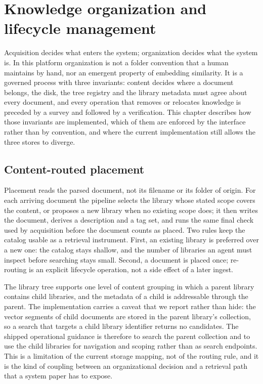 \section{Knowledge organization and lifecycle management}
\label{sec:organization}

Acquisition decides what enters the system; organization decides what the
system is. In this platform organization is not a folder convention that a
human maintains by hand, nor an emergent property of embedding similarity.
It is a governed process with three invariants: content decides where a
document belongs, the disk, the tree registry and the library metadata must
agree about every document, and every operation that removes or relocates
knowledge is preceded by a survey and followed by a verification. This
chapter describes how those invariants are implemented, which of them are
enforced by the interface rather than by convention, and where the current
implementation still allows the three stores to diverge.

\subsection{Content-routed placement}
\label{sec:org-placement}

Placement reads the parsed document, not its filename or its folder of
origin. For each arriving document the pipeline selects the library whose
stated scope covers the content, or proposes a new library when no existing
scope does; it then writes the document, derives a description and a tag
set, and runs the same final check used by acquisition before the document
counts as placed. Two rules keep the catalog usable as a retrieval
instrument. First, an existing library is preferred over a new one: the
catalog stays shallow, and the number of libraries an agent must inspect
before searching stays small. Second, a document is placed once; re-routing
is an explicit lifecycle operation, not a side effect of a later ingest.

The library tree supports one level of content grouping in which a parent
library contains child libraries, and the metadata of a child is addressable
through the parent. The implementation carries a caveat that we report
rather than hide: the vector segments of child documents are stored in the
parent library's collection, so a search that targets a child library
identifier returns no candidates. The shipped operational guidance is
therefore to search the parent collection and to use the child libraries for
navigation and scoping rather than as search endpoints. This is a limitation
of the current storage mapping, not of the routing rule, and it is the kind
of coupling between an organizational decision and a retrieval path that a
system paper has to expose.

